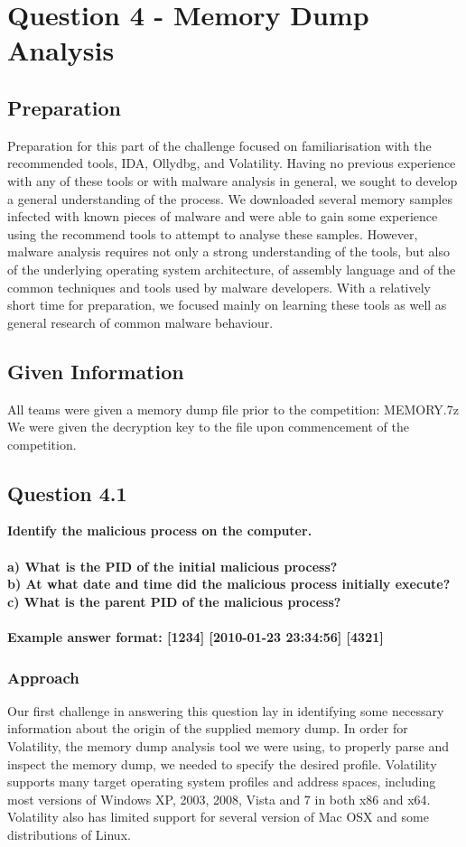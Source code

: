 \lstset{basicstyle=\tiny}

\chapter{Question 4 - Memory Dump Analysis}

\section{Preparation}
Preparation for this part of the challenge focused on familiarisation with the recommended tools, IDA, Ollydbg, and Volatility. Having no previous experience with any of these tools or with malware analysis in general, we sought to develop a general understanding of the process. We downloaded several memory samples infected with known pieces of malware and were able to gain some experience using the recommend tools to attempt to analyse these samples. However, malware analysis requires not only a strong understanding of the tools, but also of the underlying operating system architecture, of assembly language and of the common techniques and tools used by malware developers. With a relatively short time for preparation, we focused mainly on learning these tools as well as general research of common malware behaviour. 

\section{Given Information}
All teams were given a memory dump file prior to the competition: MEMORY.7z\\
We were given the decryption key to the file upon commencement of the
competition.

\section{Question 4.1}
\textbf{Identify the malicious process on the computer.
\\\\
a) What is the PID of the initial malicious process?
\\b) At what date and time did the malicious process initially execute?
\\c) What is the parent PID of the malicious process?
\\\\
Example answer format: [1234] [2010-01-23 23:34:56] [4321]}
\subsection{Approach}
Our first challenge in answering this question lay in identifying some necessary information about the origin of the supplied memory dump. In order for Volatility, the memory dump analysis tool we were using, to properly parse and inspect the memory dump, we needed to specify the desired profile. Volatility supports many target operating system profiles and address spaces, including most versions of Windows XP, 2003, 2008, Vista and 7 in both x86 and x64. Volatility also has limited support for several version of Mac OSX and some distributions of Linux. \\

